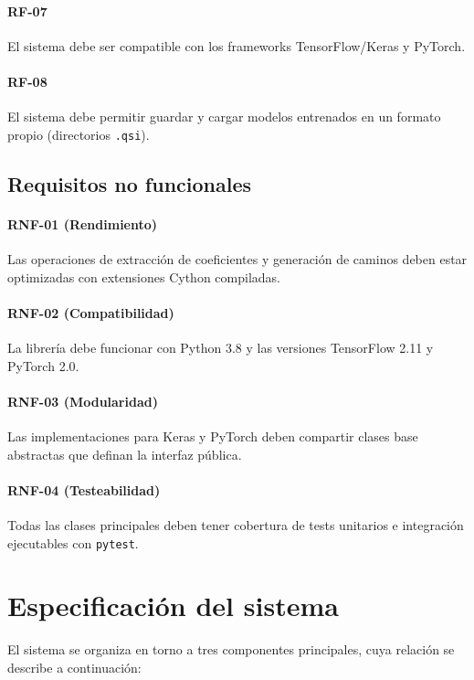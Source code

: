 \paragraph{RF-07} El sistema debe ser compatible con los frameworks TensorFlow/Keras y PyTorch.

\paragraph{RF-08} El sistema debe permitir guardar y cargar modelos entrenados en un formato propio
(directorios \texttt{.qsi}).

\subsection{Requisitos no funcionales}

\paragraph{RNF-01 (Rendimiento)} Las operaciones de extracción de coeficientes y generación de
caminos deben estar optimizadas con extensiones Cython compiladas.

\paragraph{RNF-02 (Compatibilidad)} La librería debe funcionar con Python 3.8 y las versiones
TensorFlow 2.11 y PyTorch 2.0.

\paragraph{RNF-03 (Modularidad)} Las implementaciones para Keras y PyTorch deben compartir clases
base abstractas que definan la interfaz pública.

\paragraph{RNF-04 (Testeabilidad)} Todas las clases principales deben tener cobertura de tests
unitarios e integración ejecutables con \texttt{pytest}.

\section{Especificación del sistema}

El sistema se organiza en torno a tres componentes principales, cuya relación se describe a
continuación:

